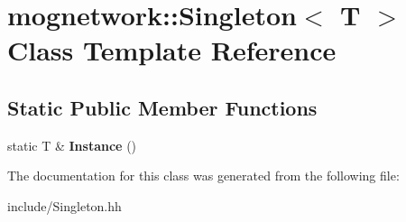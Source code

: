 \hypertarget{classmognetwork_1_1_singleton}{\section{mognetwork\-:\-:Singleton$<$ T $>$ Class Template Reference}
\label{classmognetwork_1_1_singleton}
}
\subsection*{Static Public Member Functions}
\begin{DoxyCompactItemize}
\item 
\hypertarget{classmognetwork_1_1_singleton_a52b6227ca3539ab5506744c9e98f34ab}{static T \& {\bfseries Instance} ()}\label{classmognetwork_1_1_singleton_a52b6227ca3539ab5506744c9e98f34ab}

\end{DoxyCompactItemize}


The documentation for this class was generated from the following file\-:\begin{DoxyCompactItemize}
\item 
include/Singleton.\-hh\end{DoxyCompactItemize}
